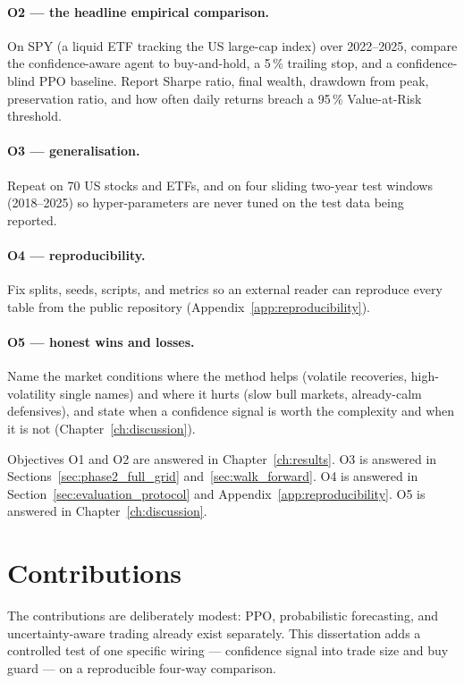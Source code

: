 \paragraph{O2 --- the headline empirical comparison.} On SPY (a liquid ETF tracking the US large-cap index) over 2022--2025, compare the confidence-aware agent to buy-and-hold, a 5\,\% trailing stop, and a confidence-blind PPO baseline. Report Sharpe ratio, final wealth, drawdown from peak, preservation ratio, and how often daily returns breach a 95\,\% Value-at-Risk threshold.

\paragraph{O3 --- generalisation.} Repeat on 70 US stocks and ETFs, and on four sliding two-year test windows (2018--2025) so hyper-parameters are never tuned on the test data being reported.

\paragraph{O4 --- reproducibility.} Fix splits, seeds, scripts, and metrics so an external reader can reproduce every table from the public repository (Appendix~\ref{app:reproducibility}).

\paragraph{O5 --- honest wins and losses.} Name the market conditions where the method helps (volatile recoveries, high-volatility single names) and where it hurts (slow bull markets, already-calm defensives), and state when a confidence signal is worth the complexity and when it is not (Chapter~\ref{ch:discussion}).

Objectives O1 and O2 are answered in Chapter~\ref{ch:results}. O3 is answered in Sections~\ref{sec:phase2_full_grid} and~\ref{sec:walk_forward}. O4 is answered in Section~\ref{sec:evaluation_protocol} and Appendix~\ref{app:reproducibility}. O5 is answered in Chapter~\ref{ch:discussion}.

\section{Contributions}
\label{sec:contributions}

The contributions are deliberately modest: PPO, probabilistic forecasting, and uncertainty-aware trading already exist separately. This dissertation adds a controlled test of one specific wiring --- confidence signal into trade size and buy guard --- on a reproducible four-way comparison.

